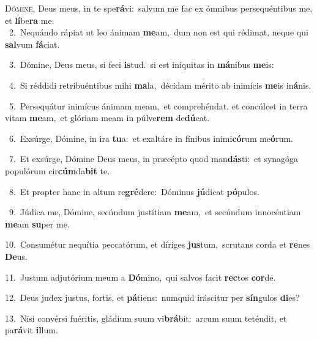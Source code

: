 \lettrine{\initial\textcolor{\initialcolor}{D}}{ómine,} Deus meus, in te spe\-\textbf{rá}\-vi:~\star salvum me fac ex ómnibus persequéntibus me, et \textbf{lí}\-be\textbf{ra} me.\\
{\numbfont\textcolor{\numbcolor}{~2.}}~Nequándo rápiat ut leo ánimam \textbf{me}\-am,~\star dum non est qui rédimat, neque qui \textbf{sal}\-vum \textbf{fá}\-ciat.\par
{\numbfont\textcolor{\numbcolor}{~3.}}~Dómine, Deus meus, si feci \textbf{is}\-tud.~\star si est iníquitas in \textbf{má}\-nibus \textbf{me}\-is:\par
{\numbfont\textcolor{\numbcolor}{~4.}}~Si réddidi retribuéntibus mihi \textbf{ma}\-la,~\star décidam mérito ab inimícis \textbf{me}\-is in\-\textbf{á}\-nis.\par
{\numbfont\textcolor{\numbcolor}{~5.}}~Persequátur inimícus ánimam meam,~\dagger et comprehéndat, et concúlcet in terra vitam \textbf{me}\-am,~\star et glóriam meam in púlve\textbf{rem} de\-\textbf{dú}\-cat.\par
{\numbfont\textcolor{\numbcolor}{~6.}}~Exsúrge, Dómine, in ira \textbf{tu}\-a:~\star et exaltáre in fínibus inimi\-\textbf{có}\-rum me\-\textbf{ó}\-rum.\par
{\numbfont\textcolor{\numbcolor}{~7.}}~Et exsúrge, Dómine Deus meus, in præcépto quod man\-\textbf{dás}\-ti:~\star et synagóga populórum cir\-\textbf{cúm}\-da\textbf{bit} te.\par
{\numbfont\textcolor{\numbcolor}{~8.}}~Et propter hanc in altum re\-\textbf{gré}\-dere:~\star Dóminus \textbf{jú}\-dicat \textbf{pó}\-pulos.\par
{\numbfont\textcolor{\numbcolor}{~9.}}~Júdica me, Dómine, secúndum justítiam \textbf{me}\-am,~\star et secúndum innocéntiam \textbf{me}\-am \textbf{su}\-per me.\par
{\numbfont\textcolor{\numbcolor}{10.}}~Consumétur nequítia peccatórum, et díriges \textbf{jus}\-tum,~\star scrutans corda et \textbf{re}\-nes \textbf{De}\-us.\par
{\numbfont\textcolor{\numbcolor}{11.}}~Justum adjutórium meum a \textbf{Dó}\-mino,~\star qui salvos facit \textbf{rec}\-tos \textbf{cor}\-de.\par
{\numbfont\textcolor{\numbcolor}{12.}}~Deus judex justus, fortis, et \textbf{pá}\-tiens:~\star numquid iráscitur per \textbf{sín}\-gulos \textbf{di}\-es?\par
{\numbfont\textcolor{\numbcolor}{13.}}~Nisi convérsi fuéritis, gládium suum vi\-\textbf{brá}\-bit:~\star arcum suum teténdit, et pa\-\textbf{rá}\-vit \textbf{il}\-lum.\par
